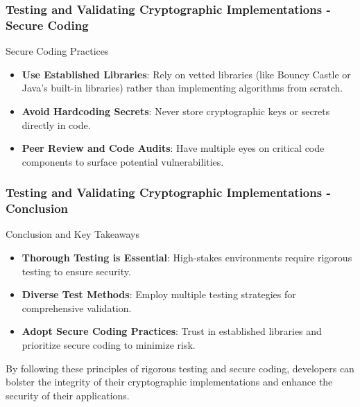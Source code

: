 \documentclass{beamer}
\begin{document}
\begin{frame}[fragile]
    \frametitle{Testing and Validating Cryptographic Implementations - Secure Coding}
    \begin{block}{Secure Coding Practices}
        \begin{itemize}
            \item \textbf{Use Established Libraries}: Rely on vetted libraries (like Bouncy Castle or Java’s built-in libraries) rather than implementing algorithms from scratch.
            \item \textbf{Avoid Hardcoding Secrets}: Never store cryptographic keys or secrets directly in code.
            \item \textbf{Peer Review and Code Audits}: Have multiple eyes on critical code components to surface potential vulnerabilities.
        \end{itemize}
    \end{block}
\end{frame}

\begin{frame}[fragile]
    \frametitle{Testing and Validating Cryptographic Implementations - Conclusion}
    \begin{block}{Conclusion and Key Takeaways}
        \begin{itemize}
            \item \textbf{Thorough Testing is Essential}: High-stakes environments require rigorous testing to ensure security.
            \item \textbf{Diverse Test Methods}: Employ multiple testing strategies for comprehensive validation.
            \item \textbf{Adopt Secure Coding Practices}: Trust in established libraries and prioritize secure coding to minimize risk.
        \end{itemize}
        By following these principles of rigorous testing and secure coding, developers can bolster the integrity of their cryptographic implementations and enhance the security of their applications.
    \end{block}
\end{frame}
\end{document}
